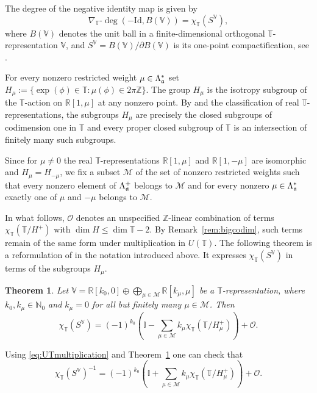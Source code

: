 \documentclass[reqno,twoside,12pt]{amsart}
\newtheorem{Theorem}[Remark]{Theorem}
\newcommand{\bI}{\mathbb{I}}
\newcommand{\bN}{\mathbb{N}}
\newcommand{\bR}{\mathbb{R}}
\newcommand{\bT}{\mathbb{T}}
\newcommand{\bV}{\mathbb{V}}
\newcommand{\bZ}{\mathbb{Z}}
\newcommand{\cM}{\mathcal{M}}
\newcommand{\cO}{\mathcal{O}}
\numberwithin{equation}{section} \errorcontextlines=0
\begin{document}
The degree of the negative identity map is given by
\begin{equation}\label{eq:degree-id}
\nabla_\bT\text{-}\deg(-\mathrm{Id},B(\bV))=\chi_\bT(S^\bV),
\end{equation}
where $B(\bV)$ denotes the unit ball in a finite-dimensional orthogonal $\bT$-representation $\bV$, and $S^\bV=B(\bV)/\partial B(\bV)$ is its one-point compactification, see \cite{Geba}.

For every nonzero restricted weight $\mu\in\Lambda_{\frak a}^*$ set
$H_\mu:=\{\exp(\phi)\in\bT:\mu(\phi)\in2\pi\bZ\}.$
The group $H_\mu$ is the isotropy subgroup of the $\bT$-action on $\bR[1,\mu]$ at any nonzero point. By \cite[Corollary 4.6.7]{DuisKolk} and the classification of real $\bT$-representations, the subgroups $H_\mu$ are precisely the closed subgroups of codimension one in $\bT$ and every proper closed subgroup of $\bT$ is an intersection of finitely many such subgroups.

Since for $\mu\neq0$ the real $\bT$-representations $\bR[1,\mu]$ and $\bR[1,-\mu]$ are isomorphic and $H_\mu=H_{-\mu}$, we fix a subset $\cM$ of the set of nonzero restricted weights such that every nonzero element of $\Lambda_{\frak a}^+$ belongs to $\cM$ and for every nonzero $\mu\in\Lambda_{\frak a}^*$ exactly one of $\mu$ and $-\mu$ belongs to $\cM$.

In what follows, $\cO$ denotes an unspecified $\bZ$-linear combination of terms $\chi_\bT(\bT/H^+)$ with $\dim H\le\dim\bT-2$. By Remark~\ref{rem:bigcodim}, such terms remain of the same form under multiplication in $U(\bT)$.
The following theorem is a reformulation of \cite[Theorem 3.2]{GarRyb} in the notation introduced above. It expresses $\chi_\bT(S^\bV)$ in terms of the subgroups $H_\mu$.
\begin{Theorem}\label{thm:UTnmult}
Let
$\bV=\bR[k_0,0]\oplus\bigoplus_{\mu\in\cM}\bR[k_\mu,\mu]$
be a $\bT$-representation, where $k_0,k_\mu\in\bN_0$ and $k_\mu=0$ for all but finitely many $\mu\in\cM$. Then
\[
\chi_\bT(S^\bV)=(-1)^{k_0}\left(\bI-\sum_{\mu\in\cM} k_\mu\chi_\bT(\bT/H_\mu^+)\right)+\cO.
\]
\end{Theorem}

Using \eqref{eq:UTmultiplication} and Theorem~\ref{thm:UTnmult} one can check that
\begin{equation}\label{eq:chi-inv-codim1}
\chi_\bT(S^\bV)^{-1}=(-1)^{k_0}\left(\bI+\sum_{\mu\in\cM} k_\mu\chi_\bT(\bT/H_{\mu}^+)\right)+\cO.
\end{equation}
\end{document}
